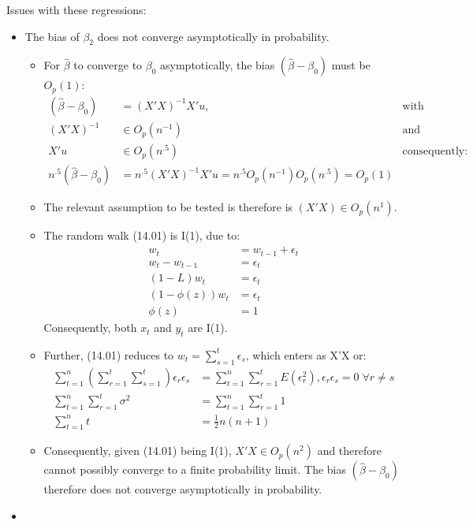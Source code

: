 \documentclass[]{article}
\begin{document}
Issues with these regressions:
\begin{itemize}
	\item The bias of $\beta_2$ does not converge asymptotically in probability. 
	\begin{itemize}
		\item For $\hat{\beta}$ to converge to $\beta_0$ asymptotically, the bias $(\hat{\beta} - \beta_0)$ must be $O_p(1)$: 
		\begin{align*}
			(\hat{\beta} - \beta_0) &= (X'X)^{-1}X'u, &\text{with}\\
			(X'X)^{-1} &\in O_p(n^{-1}) &\text{and} \\
			X'u &\in O_p(n^{.5}) &\text{consequently:}\\
			n^{.5}(\hat{\beta} - \beta_0) &= n^{.5}(X'X)^{-1}X'u = n^{.5} O_p(n^{-1})O_p(n^{.5}) = O_p(1)
		\end{align*}
		\item The relevant assumption to be tested is therefore is $(X'X) \in O_p(n^{1})$.
		\item The random walk (14.01) is I(1), due to: \begin{align*}
			w_t &= w_{t-1}+\epsilon_t \\
			w_t - w_{t-1} &= \epsilon_t \\
			(1-L)w_t  &= \epsilon_t \\
			(1-\phi(z))w_t &= \epsilon_t \\
			\phi(z) &= 1
		\end{align*} Consequently, both $x_t$ and $y_t$ are I(1).
		\item Further, (14.01) reduces to $w_t = \sum^t_{s=1}{\epsilon_s}$, which enters as X'X or: \begin{align*}
			\sum_{t=1}^n \left( \sum_{r=1}^t \sum_{s=1}^t \right) \epsilon_r \epsilon_s &= \sum_{t=1}^n \sum_{r=1}^t E(\epsilon_r^2), \epsilon_r\epsilon_s=0 \;\forall r \ne s\\
			\sum_{t=1}^n \sum_{r=1}^t \sigma^2 &= \sum_{t=1}^n \sum_{r=1}^t 1 \\
			\sum_{t=1}^n t  &= \frac{1}{2}n(n+1)
		\end{align*}
		\item Consequently, given (14.01) being I(1), $X'X \in O_p(n^2)$ and therefore cannot possibly converge to a finite probability limit. The bias $(\hat{\beta} - \beta_0)$ therefore does not converge asymptotically in probability.
	\end{itemize}
	
	\item 
\end{itemize}
\end{document}
